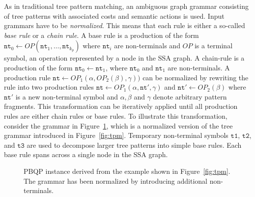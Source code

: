 As in traditional tree pattern matching, an ambiguous graph grammar
consisting of tree patterns with associated costs and semantic actions
is used. Input grammars have to be \emph{normalized}. This means that
each rule is either a so-called \emph{base rule} or a \emph{chain  rule}. A base rule is a production of the form $\texttt{nt}_0
\leftarrow \textit{OP} ( \texttt{nt}_1, \dots, \texttt{nt}_{k_p} )$
where $\texttt{nt}_i$ are non-terminals and $\textit{OP}$ is a
terminal symbol, \ie an operation represented by a node in the SSA
graph. A chain-rule is a production of the form $\texttt{nt}_0
\leftarrow \texttt{nt}_1$, where $\texttt{nt}_0$ and $\texttt{nt}_1$
are non-terminals.  A production rule $\texttt{nt} \leftarrow
\textit{OP}_1 ( \alpha, \textit{OP}_2 (\beta), \gamma))$ can be
normalized by rewriting the rule into two production rules
$\texttt{nt} \leftarrow \textit{OP}_1 ( \alpha, \texttt{nt}' ,
\gamma)$ and $\texttt{nt}' \leftarrow \textit{OP}_2 ( \beta)$ where
$\texttt{nt}'$ is a new non-terminal symbol and $\alpha,\beta$ and
$\gamma$ denote arbitrary pattern fragments.  This transformation can
be iteratively applied until all production rules are either chain
rules or base rules.  To illustrate this transformation, consider the
grammar in Figure~\ref{fig:pbpq-example}, which is a normalized
version of the tree grammar introduced in
Figure~\ref{fig:tpm}. Temporary non-terminal symbols $\texttt{t1}$,
$\texttt{t2}$, and $\texttt{t3}$ are used to decompose larger tree
patterns into simple base rules. Each base rule spans across a single
node in the SSA graph.


\begin{figure}[h]
  \begin{center}
  \end{center}
  \caption{PBQP instance derived from the example shown in
    Figure~\ref{fig:tpm}. The grammar has been normalized by
    introducing additional non-terminals.}\label{fig:pbpq-example}
\end{figure}


